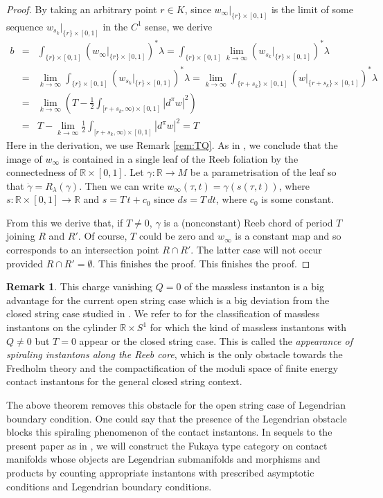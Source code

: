 \documentclass[reqno]{amsart}
\def\R{\ifmmode{\mathbb R}\else{$\mathbb R$}\fi} %
\newcommand{\beastar}{\begin{eqnarray*}}
\newcommand{\eeastar}{\end{eqnarray*}}
\theoremstyle{theorem}
\theoremstyle{definition}
\newtheorem{rem}[thm]{Remark}
\numberwithin{equation}{section}
\def\R{{\mathbb R}}
\def\R{{\mathbb R}}
\def\R{\ifmmode{\mathbb R}\else{$\mathbb R$}\fi} %
\def\R{{\mathbb R}}
\def\R{{\mathbb R}}
\begin{document}
\begin{proof}
By taking an arbitrary point $r\in K$, since $w_\infty|_{\{r\}\times [0,1]}$ is the limit of some sequence $w_{s_k}|_{\{r\}\times [0,1]}$
in the $C^1$ sense, we derive
\beastar
b& = & \int_{\{r\}\times [0,1]}(w_\infty|_{\{r\}\times [0,1]})^*\lambda
= \int_{\{r\}\times [0,1]}\lim_{k\to \infty}(w_{s_k}|_{\{r\}\times [0,1]})^*\lambda\\
&=&\lim_{k\to \infty}\int_{\{r\}\times [0,1]}(w_{s_k}|_{\{r\}\times [0,1]})^*\lambda
= \lim_{k\to \infty}\int_{\{r+s_k\}\times [0,1]}(w|_{\{r+s_k\}\times [0,1]})^*\lambda\\
&=&\lim_{k\to \infty}(T-\frac{1}{2}\int_{[r+s_k, \infty)\times [0,1]}|d^\pi w|^2)\\
&=&T-\lim_{k\to \infty}\frac{1}{2}\int_{[r+s_k, \infty)\times [0,1]}|d^\pi w|^2
= T
\eeastar
Here in the derivation, we use Remark \ref{rem:TQ}.
As in \cite{oh-wang:CR-map1}, we conclude that the image of $w_\infty$ is contained in
a single leaf of the Reeb foliation by the connectedness of $\R \times [0,1]$.
Let $\gamma: \R \to M$ be a parametrisation of
the leaf so that $\dot \gamma = R_\lambda(\gamma)$. Then we can write $w_\infty(\tau, t)=\gamma(s(\tau, t))$, where
$s:\R\times [0,1]\to \R$ and $s=T\,t+c_0$ since $ds=T\,dt$, where $c_0$ is some constant.

From this we derive that, if $T\neq 0$,
$\gamma$ is a (nonconstant) Reeb chord of period $T$ joining $R$ and $R'$.
Of course, $T$ could be zero and $w_\infty$ is a constant map and so corresponds to an intersection point $R \cap R'$. The latter case will not occur provided $R \cap R' =\emptyset$. This finishes the proof.
This finishes the proof.
\end{proof}

\begin{rem}\label{rem:big-difference} This charge vanishing $Q = 0$
of the massless instanton is a big advantage for
the current open string case which is a big deviation from
the closed string case studied in \cite{oh-wang:CR-map1,oh-wang:CR-map2,oh:contacton}.
We refer to \cite[Section 8.1]{oh:contacton} for the classification of massless instantons
on the cylinder $\R \times S^1$ for which the kind of
massless instantons with $Q \neq 0$ but $T = 0$ appear
 or the closed string case. This is called the \emph{appearance of spiraling instantons along the
Reeb core}, which is the only obstacle towards the Fredholm theory and the compactification of
the moduli space of finite energy contact instantons for the general closed string context.

The above theorem removes this obstacle for the open string case of Legendrian boundary condition.
One could say that the presence of the Legendrian obstacle
blocks this spiraling phenomenon of the contact instantons.
In sequels to the present paper as in \cite{oh:entanglement1,oh:entanglement2},
we will construct the Fukaya type category on contact manifolds whose objects are Legendrian submanifolds and morphisms and products by counting appropriate
instantons with prescribed asymptotic conditions and Legendrian boundary conditions.
\end{rem}
\end{document}
